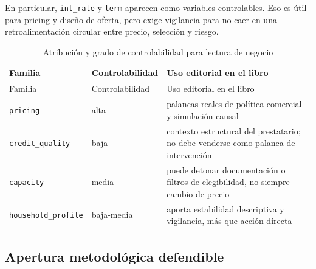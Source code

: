 \documentclass[
  spanish,
  11pt,
  letterpaper,
]{scrbook}
\theoremstyle{plain}
\theoremstyle{remark}
\begin{document}
En particular, \texttt{int\_rate} y \texttt{term} aparecen como
variables controlables. Eso es útil para pricing y diseño de oferta,
pero exige vigilancia para no caer en una retroalimentación circular
entre precio, selección y riesgo.

\begin{longtable}[]{@{}
  >{\raggedright\arraybackslash}p{}
  >{\raggedright\arraybackslash}p{}
  >{\raggedright\arraybackslash}p{}@{}}
\caption{Atribución y grado de controlabilidad para lectura de
negocio}\label{tbl-controlability-map}\tabularnewline
\toprule\noalign{}
\begin{minipage}[b]{\linewidth}\raggedright
Familia
\end{minipage} & \begin{minipage}[b]{\linewidth}\raggedright
Controlabilidad
\end{minipage} & \begin{minipage}[b]{\linewidth}\raggedright
Uso editorial en el libro
\end{minipage} \\
\midrule\noalign{}
\endfirsthead
\toprule\noalign{}
\begin{minipage}[b]{\linewidth}\raggedright
Familia
\end{minipage} & \begin{minipage}[b]{\linewidth}\raggedright
Controlabilidad
\end{minipage} & \begin{minipage}[b]{\linewidth}\raggedright
Uso editorial en el libro
\end{minipage} \\
\midrule\noalign{}
\endhead
\bottomrule\noalign{}
\endlastfoot
\texttt{pricing} & alta & palancas reales de política comercial y
simulación causal \\
\texttt{credit\_quality} & baja & contexto estructural del prestatario;
no debe venderse como palanca de intervención \\
\texttt{capacity} & media & puede detonar documentación o filtros de
elegibilidad, no siempre cambio de precio \\
\texttt{household\_profile} & baja-media & aporta estabilidad
descriptiva y vigilancia, más que acción directa \\
\end{longtable}

\subsection{Apertura metodológica
defendible}\label{apertura-metodoluxf3gica-defendible}
\end{document}
